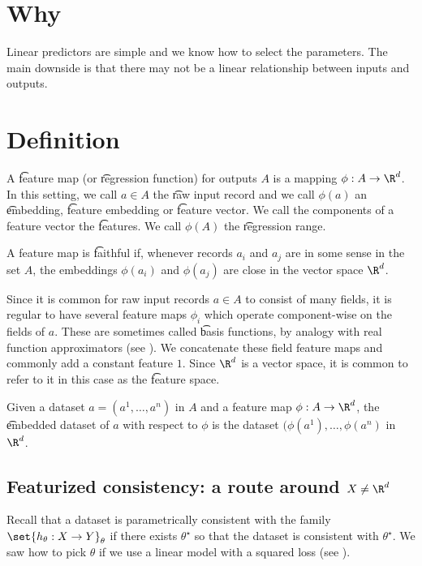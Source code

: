 

\section*{Why}

Linear predictors are simple and we know how to select the parameters.
The main downside is that there may not be a linear relationship between inputs and outputs.

\section*{Definition}

A \t{feature map} (or \t{regression function}) for outputs $A$ is a mapping $\phi : A \to \R ^d$.
In this setting, we call $a \in A$ the \t{raw input record} and we call $\phi (a)$ an \t{embedding}, \t{feature embedding} or \t{feature vector}.
We call the components of a feature vector the \t{features}.
We call $\phi (A)$ the \t{regression range}.

A feature map is \t{faithful} if, whenever records $a_i$ and $a_j$ are in some sense  in the set $A$, the embeddings $\phi (a_i)$ and $\phi (a_j)$ are close in the vector space $\R ^d$.

Since it is common for raw input records $a \in A$ to consist of many fields, it is regular to have several feature maps $\phi _i$ which operate component-wise on the fields of $a$.
These are sometimes called \t{basis functions}, by analogy with real function approximators (see ).
We concatenate these field feature maps and commonly add a constant feature $1$.
Since $\R ^d$ is a vector space, it is common to refer to it in this case as the \t{feature space}.

Given a dataset $a = (a^1, \dots , a^n)$ in $A$ and a feature map $\phi : A \to \R ^d$, the \t{embedded dataset} of $a$ with respect to $\phi $ is the dataset $(\phi (a^1), \dots , \phi (a^n)$ in $\R ^d$.

\subsection*{Featurized consistency: a route around $X \neq \R ^d$}

Recall that a dataset is parametrically consistent with the family $\set{h_{\theta }: X \to Y}_{\theta }$ if there exists $\theta ^\star$ so that the dataset is consistent with $\theta ^{\star}$.
We saw how to pick $\theta $ if we use a linear model with a squared loss (see ).

